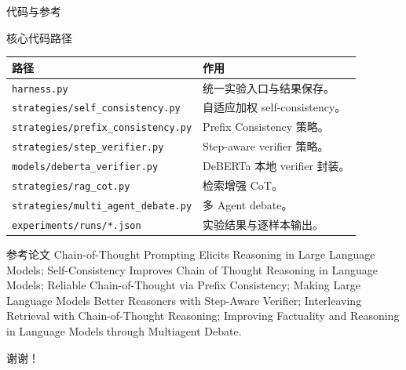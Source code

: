 \documentclass[10pt,aspectratio=169]{beamer}
\begin{document}
\begin{frame}{代码与参考}
  \begin{block}{核心代码路径}
    \small
    \begin{tabularx}{\linewidth}{lY}
      \toprule
      路径 & 作用 \\
      \midrule
      \texttt{harness.py} & 统一实验入口与结果保存。 \\
      \texttt{strategies/self\_consistency.py} & 自适应加权 self-consistency。 \\
      \texttt{strategies/prefix\_consistency.py} & Prefix Consistency 策略。 \\
      \texttt{strategies/step\_verifier.py} & Step-aware verifier 策略。 \\
      \texttt{models/deberta\_verifier.py} & DeBERTa 本地 verifier 封装。 \\
      \texttt{strategies/rag\_cot.py} & 检索增强 CoT。 \\
      \texttt{strategies/multi\_agent\_debate.py} & 多 Agent debate。 \\
      \texttt{experiments/runs/*.json} & 实验结果与逐样本输出。 \\
      \bottomrule
    \end{tabularx}
  \end{block}
  \begin{block}{参考论文}
    \scriptsize
    Chain-of-Thought Prompting Elicits Reasoning in Large Language Models;
    Self-Consistency Improves Chain of Thought Reasoning in Language Models;
    Reliable Chain-of-Thought via Prefix Consistency;
    Making Large Language Models Better Reasoners with Step-Aware Verifier;
    Interleaving Retrieval with Chain-of-Thought Reasoning;
    Improving Factuality and Reasoning in Language Models through Multiagent Debate.
  \end{block}
\end{frame}

\begin{frame}
  \centering
  \vspace{2.2cm}
  {\Huge 谢谢！}\\[0.8em]
\end{frame}
\end{document}
